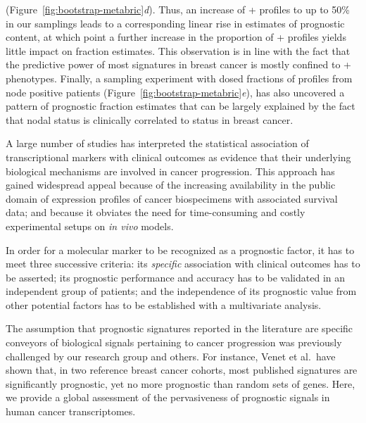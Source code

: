 (Figure~\ref{fig:bootstrap-metabric}\emph{d}).  Thus, an increase of
+ profiles to up to 50\% in our samplings leads to a corresponding
linear rise in estimates of prognostic content, at which point a further
increase in the proportion of + profiles yields little impact on
fraction estimates.  This observation is in line with the fact that the
predictive power of most signatures in breast cancer is mostly confined to
+ phenotypes.\cite{weigelt_challenges_2012} Finally, a sampling
experiment with dosed fractions of profiles from node positive patients
(Figure~\ref{fig:bootstrap-metabric}\emph{e}), has also uncovered a pattern of
prognostic fraction estimates that can be largely explained by the fact that
nodal status is clinically correlated to  status in breast cancer.

\medskip

A large number of studies has interpreted the statistical association of
transcriptional markers with clinical outcomes as evidence that their underlying
biological mechanisms are involved in cancer progression.  This approach has
gained widespread appeal because of the increasing availability in the public
domain of expression profiles of cancer biospecimens with associated survival
data; and because it obviates the need for time-consuming and costly
experimental setups on \emph{in vivo} models.

In order for a molecular marker to be recognized as a prognostic factor, it has
to meet three successive criteria: its \emph{specific} association with clinical
outcomes has to be asserted; its prognostic performance and accuracy has to be
validated in an independent group of patients; and the independence of its
prognostic value from other potential factors has to be established with a
multivariate analysis.\cite{chibon_cancer_2013}

The assumption that prognostic signatures reported in the literature are
specific conveyors of biological signals pertaining to cancer progression was
previously challenged by our research group and
others.\cite{venet_most_2011,lauss_prediction_2010,ein-dor_outcome_2005,mosley_cell_2008}
For instance, Venet et al.\ have shown that, in two reference breast cancer
cohorts, most published signatures are significantly prognostic, yet no more
prognostic than random sets of genes.\cite{venet_most_2011}
Here, we provide a global assessment of the pervasiveness of prognostic signals
in human cancer transcriptomes.

